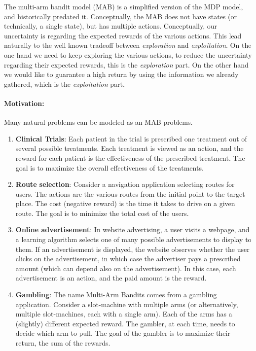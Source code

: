 
The multi-arm bandit model (MAB) is a simplified version of the MDP model, and historically predated it. Conceptually, the MAB does not have states (or technically, a single state), but has multiple actions. Conceptually, our uncertainty is regarding the expected rewards of the various actions. This lead naturally to the well known tradeoff between \emph{exploration} and \emph{exploitation}. On the one hand we need to keep exploring the various actions, to reduce the uncertainty regarding their expected rewards, this is the \emph{exploration} part. On the other hand we would like to guarantee a high return by using the information we already gathered, which is the \emph{exploitation} part.


\paragraph{Motivation:} Many natural problems can be modeled as an MAB problems.
\begin{enumerate}
\item \textbf{Clinical Trials}: Each patient in the trial is prescribed one treatment out of several possible treatments. Each treatment is viewed as an action, and the reward for each patient is the effectiveness of the prescribed treatment. The goal is to maximize the overall effectiveness of the treatments.
\item \textbf{Route selection}: Consider a navigation application selecting routes for users. The actions are the various routes from the initial point to the target place. The cost (negative reward) is the time it takes to drive on a given route. The goal is to minimize the total cost of the users.
\item \textbf{Online advertisement}: In website advertising, a user visits a webpage, and a learning algorithm selects one of many possible advertisements to display to them. If an advertisement is displayed, the website observes whether the user clicks on the advertisement, in which case the advertiser pays
a prescribed amount (which can depend also on the advertisement). In this case, each advertisement is an action, and the paid amount is the reward.
\item \textbf{Gambling}: The name Multi-Arm Bandits comes from a gambling application. Consider a slot-machine with multiple arms (or alternatively, multiple slot-machines, each with a single arm). Each of the arms has a (slightly) different expected reward. The gambler, at each time, needs to decide which arm to pull. The goal of the gambler is to maximize their return, the sum of the rewards.
\end{enumerate}

